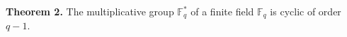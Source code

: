 \textbf{Theorem 2.} The multiplicative group $\mathbb{F}_q^*$ of a finite field $\mathbb{F}_q$ is cyclic of order $q-1$.
